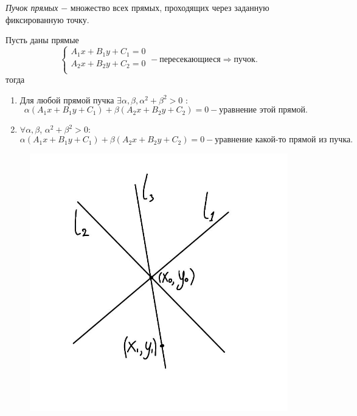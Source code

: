 \begin{definition}
    \textit{Пучок прямых} $-$ множество всех прямых, проходящих через заданную фиксированную точку.
\end{definition}

\begin{theorem}
    Пусть даны прямые
    \[
    \begin{cases}
        A_1 x + B_1 y + C_1 = 0\\
        A_2 x + B_2 y + C_2 = 0\\
    \end{cases} - \text{пересекающиеся} \Longrightarrow \text{пучок}.
    \] тогда
    \begin{enumerate}
        \item Для любой прямой пучка $\exists\alpha, \beta, \alpha^2 + \beta^2 > 0$ :
        \[
        \alpha(A_1 x + B_1 y + C_1) + \beta(A_2 x + B_2 y + C_2) = 0 - \text{уравнение этой прямой.}
        \]
        \item $\forall\alpha,\beta$, $\alpha^2 + \beta^2 > 0$:
        \[
        \alpha(A_1 x + B_1 y + C_1) + \beta(A_2 x + B_2 y + C_2) = 0 - \text{уравнение какой-то прямой из пучка.}
        \]
    \end{enumerate}
\end{theorem}
\begin{figure}
    \includegraphics[width=0.84\linewidth]{images/1.5.jpeg}
\end{figure}

